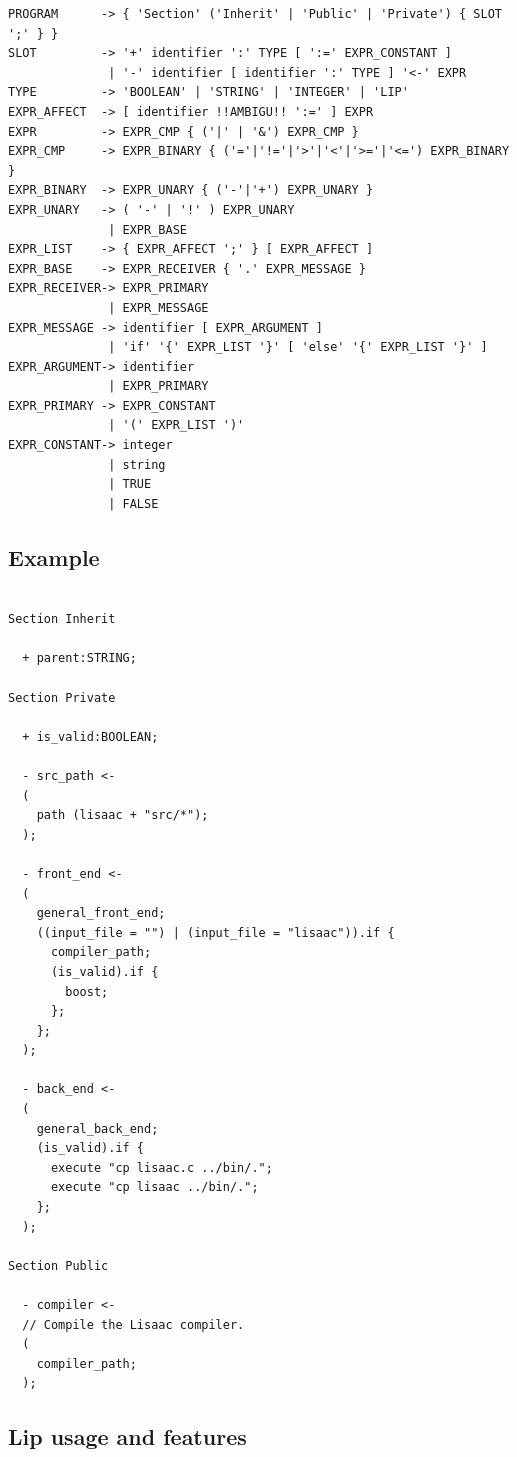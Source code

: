 \documentclass[11pt]{mybook}
\begin{document}
\begin{lstlisting}[frame=trBL]
PROGRAM      -> { 'Section' ('Inherit' | 'Public' | 'Private') { SLOT ';' } } 
SLOT         -> '+' identifier ':' TYPE [ ':=' EXPR_CONSTANT ]
              | '-' identifier [ identifier ':' TYPE ] '<-' EXPR  
TYPE         -> 'BOOLEAN' | 'STRING' | 'INTEGER' | 'LIP'
EXPR_AFFECT  -> [ identifier !!AMBIGU!! ':=' ] EXPR
EXPR         -> EXPR_CMP { ('|' | '&') EXPR_CMP }                
EXPR_CMP     -> EXPR_BINARY { ('='|'!='|'>'|'<'|'>='|'<=') EXPR_BINARY }
EXPR_BINARY  -> EXPR_UNARY { ('-'|'+') EXPR_UNARY }
EXPR_UNARY   -> ( '-' | '!' ) EXPR_UNARY
              | EXPR_BASE  
EXPR_LIST    -> { EXPR_AFFECT ';' } [ EXPR_AFFECT ]
EXPR_BASE    -> EXPR_RECEIVER { '.' EXPR_MESSAGE } 
EXPR_RECEIVER-> EXPR_PRIMARY 
              | EXPR_MESSAGE
EXPR_MESSAGE -> identifier [ EXPR_ARGUMENT ]              
              | 'if' '{' EXPR_LIST '}' [ 'else' '{' EXPR_LIST '}' ]              
EXPR_ARGUMENT-> identifier 
              | EXPR_PRIMARY
EXPR_PRIMARY -> EXPR_CONSTANT
              | '(' EXPR_LIST ')'
EXPR_CONSTANT-> integer              
              | string
              | TRUE
              | FALSE
\end{lstlisting}

\subsection{Example}

\begin{lstlisting}

Section Inherit

  + parent:STRING;

Section Private

  + is_valid:BOOLEAN;

  - src_path <-
  (
    path (lisaac + "src/*");
  );

  - front_end <-
  (
    general_front_end;
    ((input_file = "") | (input_file = "lisaac")).if {
      compiler_path;
      (is_valid).if {
        boost;
      };
    };
  );

  - back_end <-
  (
    general_back_end;
    (is_valid).if {
      execute "cp lisaac.c ../bin/.";
      execute "cp lisaac ../bin/.";
    };
  );

Section Public

  - compiler <-
  // Compile the Lisaac compiler.
  (
    compiler_path;
  );
\end{lstlisting}


\subsection{Lip usage and features}
\end{document}
